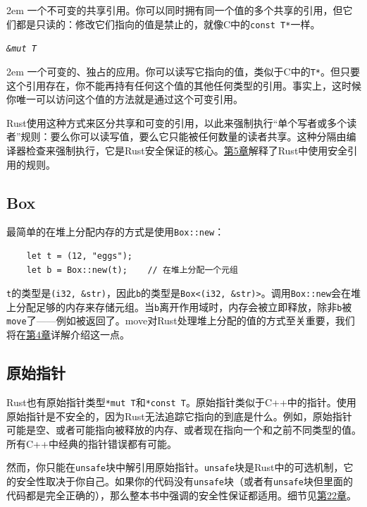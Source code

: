 \hangindent 2em
\noindent
一个不可变的共享引用。你可以同时拥有同一个值的多个共享的引用，但它们都是只读的：修改它们指向的值是禁止的，就像C中的\texttt{const T*}一样。

\begin{flushleft}
    \emph{\texttt{\&mut T}}
\end{flushleft}

\hangindent 2em
\noindent
一个可变的、独占的应用。你可以读写它指向的值，类似于C中的\texttt{T*}。但只要这个引用存在，你不能再持有任何这个值的其他任何类型的引用。事实上，这时候你唯一可以访问这个值的方法就是通过这个可变引用。

Rust使用这种方式来区分共享和可变的引用，以此来强制执行“单个写者或多个读者”规则：要么你可以读写值，要么它只能被任何数量的读者共享。这种分隔由编译器检查来强制执行，它是Rust安全保证的核心。\hyperref[ch05]{第5章}解释了Rust中使用安全引用的规则。

\subsection{Box}

最简单的在堆上分配内存的方式是使用\texttt{Box::new}：
\begin{verbatim}
    let t = (12, "eggs");
    let b = Box::new(t);    // 在堆上分配一个元组
\end{verbatim}

\texttt{t}的类型是\texttt{(i32, \&str)}，因此\texttt{b}的类型是\texttt{Box<(i32, \&str)>}。调用\texttt{Box::new}会在堆上分配足够的内存来存储元组。当\texttt{b}离开作用域时，内存会被立即释放，除非\texttt{b}被\texttt{move}了——例如被返回了。move对Rust处理堆上分配的值的方式至关重要，我们将在\hyperref[ch04]{第4章}详解介绍这一点。

\subsection{原始指针}

Rust也有原始指针类型\texttt{*mut T}和\texttt{*const T}。原始指针类似于C++中的指针。使用原始指针是不安全的，因为Rust无法追踪它指向的到底是什么。例如，原始指针可能是空、或者可能指向被释放的内存、或者现在指向一个和之前不同类型的值。所有C++中经典的指针错误都有可能。

然而，你只能在\texttt{unsafe}块中解引用原始指针。\texttt{unsafe}块是Rust中的可选机制，它的安全性取决于你自己。如果你的代码没有\texttt{unsafe}块（或者有\texttt{unsafe}块但里面的代码都是完全正确的），那么整本书中强调的安全性保证都适用。细节见\hyperref[ch22]{第22章}。

